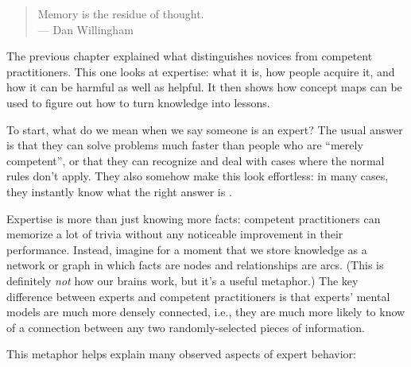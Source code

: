
\begin{quote}

  Memory is the residue of thought. \\
  --- Dan Willingham

\end{quote}

The previous chapter explained what distinguishes novices from competent
practitioners. This one looks at expertise: what it is, how people
acquire it, and how it can be harmful as well as helpful. It then shows
how concept maps can be used to figure out how to turn knowledge into
lessons.

To start, what do we mean when we say someone is an expert? The usual
answer is that they can solve problems much faster than people who are
``merely competent'', or that they can recognize and deal with cases
where the normal rules don't apply. They also somehow make this look
effortless: in many cases, they instantly know what the right answer is
\cite{Parn2017}.

Expertise is more than just knowing more facts: competent practitioners
can memorize a lot of trivia without any noticeable improvement in their
performance. Instead, imagine for a moment that we store knowledge as a
network or graph in which facts are nodes and relationships are arcs.
(This is definitely \emph{not} how our brains work, but it's a useful
metaphor.) The key difference between experts and competent
practitioners is that experts' mental models are much more densely
connected, i.e., they are much more likely to know of a connection
between any two randomly-selected pieces of information.

This metaphor helps explain many observed aspects of expert behavior:

